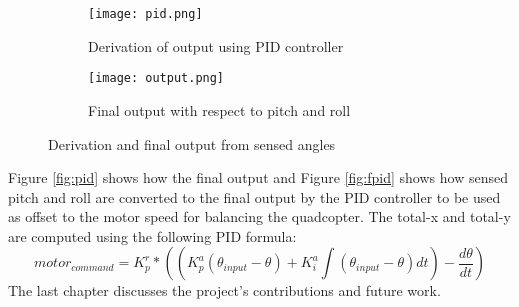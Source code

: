 \begin{figure}[H]
  \begin{subfigure}{1\textwidth}
    \centering
    \texttt{[image: pid.png]}
    \caption{Derivation of output using PID controller\label{fig:pid}}
    \label{Motor output}  
  \end{subfigure}
  \begin{subfigure}{1\textwidth}
    \centering
    \texttt{[image: output.png]}
    \caption{Final output with respect to pitch and roll\label{fig:fpid}}
    \label{Measurement of pitch and roll} 
  \end{subfigure}
  \caption{Derivation and final output from sensed angles}
\end{figure}
\noindent
Figure \ref{fig:pid} shows how the final output and Figure \ref{fig:fpid} shows how sensed pitch and roll are converted to the final output by the PID controller to be used as offset to the motor speed for balancing the quadcopter. The total-x and total-y are computed using the following PID formula:
\begin{equation}
motor_{command} = K_p^r*((K_p^a(\theta_{input} - \theta) + K_i^a\int (\theta_{input} - \theta)dt) -\frac{d\theta}{dt})
\end{equation}
\newline
\newline
The last chapter discusses the project's contributions and future work.
